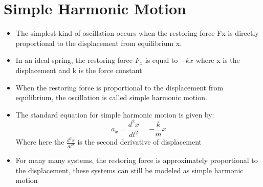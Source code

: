 \documentclass[11pt, a4paper]{article}
\begin{document}
\section[14.2, Simple Harmonic Motion]{Simple Harmonic Motion}
\begin{itemize}
    \item The simplest kind of oscillation occurs when the restoring force Fx is
        directly proportional to the displacement from equilibrium x.
    \item In an ideal spring, the restoring force $F_x$ is equal to $-kx$ where x is
        the displacement and k is the force constant
    \item When the restoring force is proportional to the displacement from equilibrium,
        the oscillation is called simple harmonic motion.
    \item The standard equation for simple harmonic motion is given by:
        \begin{equation}
            a_x = \frac{d^2x}{dt^2} = -\frac{k}{m}x
        \end{equation}
        Where here the $\frac{d^2x}{dt^2}$ is the second derivative of displacement
    \item For many many systems, the restoring force is approximately proportional to
        the displacement, these systems can still be modeled as simple harmonic motion
\end{itemize}
\end{document}

